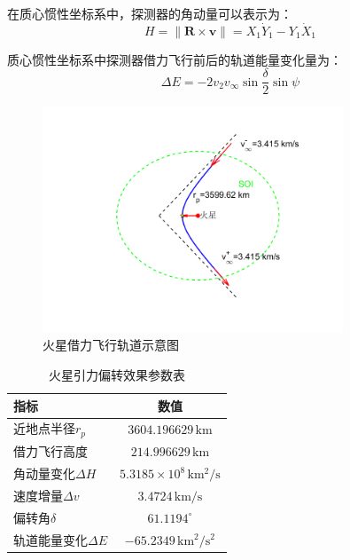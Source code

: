 \documentclass[12pt,a4paper]{article}
\begin{document}
在质心惯性坐标系中，探测器的角动量可以表示为：
\begin{equation}
    H = \|\mathbf{R} \times \mathbf{v}\| = X_1 \dot{Y}_1 - Y_1 \dot{X}_1
\end{equation}

质心惯性坐标系中探测器借力飞行前后的轨道能量变化量为：
\begin{equation}
    \Delta E = -2 v_2 v_{\infty} \sin \frac{\delta}{2} \sin \psi
\end{equation}

\begin{figure}[H]
    \centering
    \includegraphics[width=0.8\textwidth]{images/schematic.png}
    \caption{火星借力飞行轨道示意图}
\end{figure}

\begin{table}[H]
    \centering
    \caption{火星引力偏转效果参数表}
    \label{tab:mars_gravity}
    \begin{tabular}{lc}
        \toprule
        指标 & 数值 \\
        \midrule
        近地点半径$r_p$ & $3604.196629\,\mathrm{km}$ \\
        借力飞行高度 & 
        $214.996629\,\mathrm{km}$\\
        角动量变化$\Delta H$ & $5.3185 \times 10^{8}\,\mathrm{km^{2}/s}$ \\
        速度增量$\Delta v$ & $3.4724\,\mathrm{km/s}$ \\
        偏转角$\delta$ & $61.1194^\circ$ \\
        轨道能量变化$\Delta E$ & $-65.2349\,\mathrm{km^2/s^2}$ \\
        \bottomrule
    \end{tabular}
\end{table}
\end{document}

